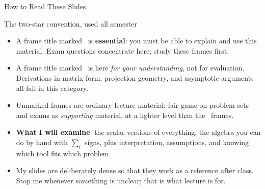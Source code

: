 \documentclass[aspectratio=169,11pt,xcolor=dvipsnames]{beamer}
\newcommand{\adv}{\,\raisebox{0.6pt}{\textcolor{accent}{$\bigstar$}}}
\newcommand{\core}{\,\raisebox{0.6pt}{\textcolor{corestar}{$\bigstar$}}}
\begin{document}
\begin{frame}{How to Read These Slides}
\begin{alertblock}{The two-star convention, used all semester}
\begin{itemize}\itemsep2pt
  \item A frame title marked \core{} is \textbf{essential}: you must be able to
        explain and use this material. Exam questions concentrate here; study
        these frames first.
  \item A frame title marked \adv{} is here \emph{for your understanding}, not
        for evaluation. Derivations in matrix form, projection geometry, and
        asymptotic arguments all fall in this category.
  \item Unmarked frames are ordinary lecture material: fair game on problem
        sets and exams as \emph{supporting} material, at a lighter level than
        the \core{} frames.
\end{itemize}
\end{alertblock}
\vskip3pt
\begin{itemize}\itemsep3pt
  \item \textbf{What I will examine}: the \alert{scalar} versions of everything,
        the algebra you can do by hand with $\sum_i$ signs, plus interpretation,
        assumptions, and knowing which tool fits which problem.
  \item My slides are deliberately dense so that they work as a reference after
        class. Stop me whenever something is unclear; that is what lecture is for.
\end{itemize}
\end{frame}
\end{document}
